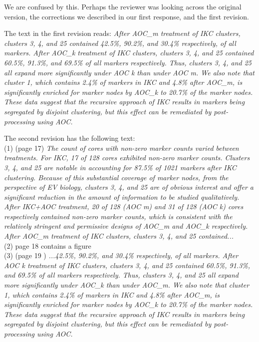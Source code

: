 \documentclass[11pt, oneside]{article}   	%
\begin{document}
We are confused by this. Perhaps the reviewer was looking across the original version, the corrections we described in our first response, and the first revision. 

The text in the first revision reads: \emph{After AOC\_m treatment of IKC clusters, clusters 3, 4, and 25 contained 42.5\%, 90.2\%, and 30.4\% respectively, of all markers. After AOC\_k treatment of IKC clusters, clusters 3, 4, and 25 contained 60.5\%, 91.3\%, and 69.5\% of all markers respectively. Thus, clusters 3, 4, and 25 all expand more significantly under AOC k than under AOC m. We also note that cluster 1, which contains 2.4\% of markers in IKC and 4.8\% after AOC\_m, is significantly enriched for marker nodes by AOC\_k to 20.7\% of the marker nodes. These data suggest that the recursive approach of IKC results in markers being segregated by disjoint clustering, but this effect can be remediated by post-processing using AOC.}

The second revision has the following text: \\(1)  (page 17)   \emph{The count of cores with non-zero marker counts varied between treatments. For IKC, 17 of 128 cores exhibited non-zero marker counts. Clusters 3, 4, and 25 are notable in accounting for 87.5\% of 1021 markers after IKC clustering. Because of this substantial coverage of marker nodes, from the perspective of EV biology, clusters 3, 4, and 25 are of obvious interest and offer a significant reduction in the amount of information to be studied qualitatively.
After IKC+AOC treatment, 20 of 128 (AOC m) and 31 of 128 (AOC k) cores respectively contained non-zero marker counts, which is consistent with the relatively stringent and permissive designs of AOC\_m and AOC\_k respectively. After AOC\_m treatment of IKC clusters, clusters 3, 4, and 25 contained...}\\
(2) page 18 contains a figure\\
(3) (page 19 ) \emph{...42.5\%, 90.2\%, and 30.4\% respectively, of all markers. After AOC k treatment of IKC clusters, clusters 3, 4, and 25 contained 60.5\%, 91.3\%, and 69.5\% of all markers respectively. Thus, clusters 3, 4, and 25 all expand more significantly under AOC\_k than under AOC\_m. We also note that cluster 1, which contains 2.4\% of markers in IKC and 4.8\% after AOC\_m, is significantly enriched for marker nodes by AOC\_k to 20.7\% of the marker nodes. These data suggest that the recursive approach of IKC results in markers being segregated by disjoint clustering, but this effect can be remediated by post-processing using AOC.}
\end{document}
